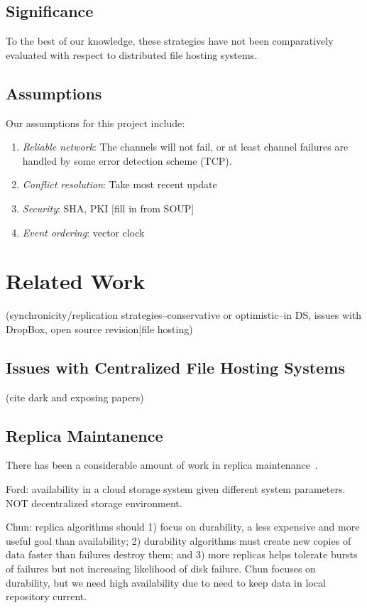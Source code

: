 \subsection{Significance}
To the best of our knowledge, these strategies have not been comparatively evaluated with respect to distributed file hosting systems.

\subsection{Assumptions}
Our assumptions for this project include:
\begin{enumerate}
\item \emph{Reliable network}: The channels will not fail, or at least channel failures are handled by some error detection scheme (TCP).
\item \emph{Conflict resolution}: Take most recent update
\item \emph{Security}: SHA, PKI [fill in from SOUP]
\item \emph{Event ordering}: vector clock
\end{enumerate}

\section{Related Work}
(synchronicity/replication strategies--conservative or optimistic--in DS, issues with DropBox, open source revision|file hosting)

\subsection{Issues with Centralized File Hosting Systems}
(cite dark and exposing papers)

\subsection{Replica Maintanence}
There has been a considerable amount of work in replica maintenance~\cite{chun2006replica,pu1991replica,ford2010availability}.

Ford: availability in a cloud storage system given different system parameters.
NOT decentralized storage environment.

Chun: replica algorithms should 1) focus on durability, a less expensive and more useful goal than availability; 2) durability algorithms must create new copies of data faster than failures destroy them; and 3) more replicas helps tolerate bursts of failures but not increasing likelihood of disk failure.
Chun focuses on durability, but we need high availability due to need to keep data in local repository current.

